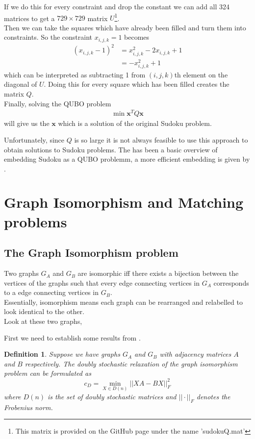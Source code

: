\documentclass{article}
\newtheorem{defn}[prop]{Definition}
\begin{document}
\noindent If we do this for every constraint and drop the constant we can add all 324 matrices to get a \(729 \times 729\) matrix \(U\)\footnote{This matrix is provided on the GitHub page under the name 'sudokuQ.mat' }.\\

\noindent Then we can take the squares which have already been filled and turn them into constraints. So the constraint \(x_{i,j,k} = 1\) becomes 
\begin{align*}
    (x_{i,j,k} - 1)^2 &= x_{i,j,k}^2 - 2x_{i,j,k} + 1 \\
    &= -x_{i,j,k}^2 + 1
\end{align*}
which can be interpreted as subtracting 1 from \((i,j,k)\)th element on the diagonal of \(U\). Doing this for every square which has been filled creates the matrix \(Q\).\\

\noindent Finally, solving the QUBO problem
\begin{align*}
    \min \mathbf{x}^T Q \mathbf{x}
\end{align*}
will give us the \(\mathbf{x}\) which is a solution of the original Sudoku problem.
 
Unfortunately, since \(Q\) is so large it is not always feasible to use this approach to obtain solutions to Sudoku problems. The has been a basic overview of embedding Sudoku as a QUBO problemm, a more efficient embedding is given by \cite{mücke2024sudoku}.

\section{Graph Isomorphism and Matching problems}
\subsection{The Graph Isomorphism problem}
Two graphs \(G_A\) and \(G_B\) are isomorphic iff there exists a bijection between the vertices of the graphs such that every edge connecting vertices in \(G_A\) corresponds to a edge connecting vertices in \(G_B\). \\
Essentially, isomorphism means each graph can be rearranged and relabelled to look identical to the other. \\

\noindent Look at these two graphs, 


\noindent First we need to establish some results from \autocite{klus2023continuous}.
\begin{defn}\label{def:1}
    \cite[p.~6]{klus2023continuous} Suppose we have graphs \(G_A\) and \(G_B\) with adjacency matrices \(A\) and \(B\) respectively. The doubly stochastic relaxation of the graph isomorphism problem can be formulated as
    \begin{equation*}
        c_D = \min_{X \in D(n)} ||XA - BX||^2_F
    \end{equation*}
    where \(D(n)\) is the set of doubly stochastic matrices and \(||\cdot||_F\) denotes the Frobenius norm.
\end{defn}
\end{document}
